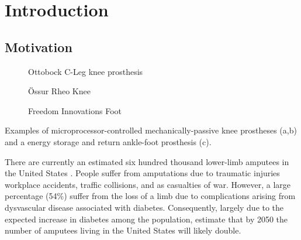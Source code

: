 \chapter{Introduction}

\section{Motivation}
\begin{marginfigure}[0.8in]
    \centering
	\begin{subfigure}[b]{\textwidth}
    	\centering
        \caption{Ottobock C-Leg knee prosthesis}
        \label{fig:ottobock_cleg}
        \vspace{0.25in}
	\end{subfigure}
	\begin{subfigure}[b]{\textwidth}
    	\centering
        \caption{Össur Rheo Knee}
        \label{fig:ossur_rheo}
        \vspace{0.25in}
	\end{subfigure}
	\begin{subfigure}[b]{\textwidth}
    	\centering
        \caption{Freedom Innovations Foot}
        \label{fig:freedom_innovations_foot}
	\end{subfigure}
    \caption{Examples of microprocessor-controlled mechanically-passive knee
    prostheses (a,b) and a energy storage and return ankle-foot prosthesis (c).}
\end{marginfigure}
There are currently an estimated six hundred thousand lower-limb amputees in the
United States \citep{ziegler2008estimating}. People suffer from amputations due
to traumatic injuries workplace accidents, traffic collisions, and as casualties
of war. However, a large percentage (54\%) suffer from the loss of a limb due to
complications arising from dysvascular disease associated with diabetes.
Consequently, largely due to the expected increase in diabetes among the
population, \citet{ziegler2008estimating} estimate that by 2050 the number of
amputees living in the United States will likely double.

